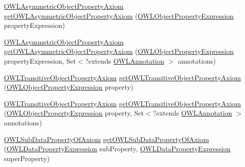 \begin{DoxyCompactItemize}
\item 
\hyperlink{interfaceorg_1_1semanticweb_1_1owlapi_1_1model_1_1_o_w_l_asymmetric_object_property_axiom}{O\-W\-L\-Asymmetric\-Object\-Property\-Axiom} \hyperlink{interfaceorg_1_1semanticweb_1_1owlapi_1_1model_1_1_o_w_l_data_factory_aabf5b82cfd5d27154bfa2f9869ff6b36}{get\-O\-W\-L\-Asymmetric\-Object\-Property\-Axiom} (\hyperlink{interfaceorg_1_1semanticweb_1_1owlapi_1_1model_1_1_o_w_l_object_property_expression}{O\-W\-L\-Object\-Property\-Expression} property\-Expression)
\item 
\hyperlink{interfaceorg_1_1semanticweb_1_1owlapi_1_1model_1_1_o_w_l_asymmetric_object_property_axiom}{O\-W\-L\-Asymmetric\-Object\-Property\-Axiom} \hyperlink{interfaceorg_1_1semanticweb_1_1owlapi_1_1model_1_1_o_w_l_data_factory_ac6766813b1fae1a222127a9839e5fed4}{get\-O\-W\-L\-Asymmetric\-Object\-Property\-Axiom} (\hyperlink{interfaceorg_1_1semanticweb_1_1owlapi_1_1model_1_1_o_w_l_object_property_expression}{O\-W\-L\-Object\-Property\-Expression} property\-Expression, Set$<$?extends \hyperlink{interfaceorg_1_1semanticweb_1_1owlapi_1_1model_1_1_o_w_l_annotation}{O\-W\-L\-Annotation} $>$ annotations)
\item 
\hyperlink{interfaceorg_1_1semanticweb_1_1owlapi_1_1model_1_1_o_w_l_transitive_object_property_axiom}{O\-W\-L\-Transitive\-Object\-Property\-Axiom} \hyperlink{interfaceorg_1_1semanticweb_1_1owlapi_1_1model_1_1_o_w_l_data_factory_a7f980d83ed7f1313dca5815ade0508e3}{get\-O\-W\-L\-Transitive\-Object\-Property\-Axiom} (\hyperlink{interfaceorg_1_1semanticweb_1_1owlapi_1_1model_1_1_o_w_l_object_property_expression}{O\-W\-L\-Object\-Property\-Expression} property)
\item 
\hyperlink{interfaceorg_1_1semanticweb_1_1owlapi_1_1model_1_1_o_w_l_transitive_object_property_axiom}{O\-W\-L\-Transitive\-Object\-Property\-Axiom} \hyperlink{interfaceorg_1_1semanticweb_1_1owlapi_1_1model_1_1_o_w_l_data_factory_ac0299e478d04c1655e761031deb3abab}{get\-O\-W\-L\-Transitive\-Object\-Property\-Axiom} (\hyperlink{interfaceorg_1_1semanticweb_1_1owlapi_1_1model_1_1_o_w_l_object_property_expression}{O\-W\-L\-Object\-Property\-Expression} property, Set$<$?extends \hyperlink{interfaceorg_1_1semanticweb_1_1owlapi_1_1model_1_1_o_w_l_annotation}{O\-W\-L\-Annotation} $>$ annotations)
\item 
\hyperlink{interfaceorg_1_1semanticweb_1_1owlapi_1_1model_1_1_o_w_l_sub_data_property_of_axiom}{O\-W\-L\-Sub\-Data\-Property\-Of\-Axiom} \hyperlink{interfaceorg_1_1semanticweb_1_1owlapi_1_1model_1_1_o_w_l_data_factory_a9f35ca222be4d573ca968981efd97f52}{get\-O\-W\-L\-Sub\-Data\-Property\-Of\-Axiom} (\hyperlink{interfaceorg_1_1semanticweb_1_1owlapi_1_1model_1_1_o_w_l_data_property_expression}{O\-W\-L\-Data\-Property\-Expression} sub\-Property, \hyperlink{interfaceorg_1_1semanticweb_1_1owlapi_1_1model_1_1_o_w_l_data_property_expression}{O\-W\-L\-Data\-Property\-Expression} super\-Property)

\end{DoxyCompactItemize}
